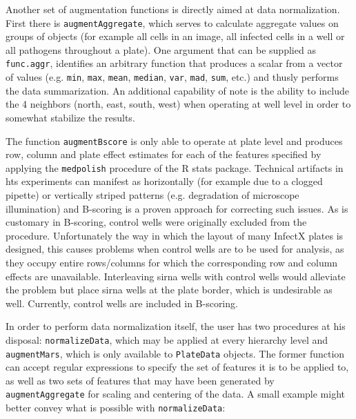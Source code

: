 Another set of augmentation functions is directly aimed at data normalization. First there is \texttt{augmentAggregate}, which serves to calculate aggregate values on groups of objects (for example all cells in an image, all infected cells in a well or all pathogens throughout a plate). One argument that can be supplied as \texttt{func.aggr}, identifies an arbitrary function that produces a scalar from a vector of values (e.g. \texttt{min}, \texttt{max}, \texttt{mean}, \texttt{median}, \texttt{var}, \texttt{mad}, \texttt{sum}, etc.) and thusly performs the data summarization. An additional capability of note is the ability to include the 4 neighbors (north, east, south, west) when operating at well level in order to somewhat stabilize the results.

The function \texttt{augmentBscore} is only able to operate at plate level and produces row, column and plate effect estimates for each of the features specified by applying the \texttt{medpolish} procedure of the R stats package. Technical artifacts in \gls{hts} experiments can manifest as horizontally (for example due to a clogged pipette) or vertically striped patterns (e.g. degradation of microscope illumination) and B-scoring is a proven approach for correcting such issues. As is customary in B-scoring, control wells were originally excluded from the procedure. Unfortunately the way in which the layout of many InfectX plates is designed, this causes problems when control wells are to be used for analysis, as they occupy entire rows\slash columns for which the corresponding row and column effects are unavailable. Interleaving \gls{sirna} wells with control wells would alleviate the problem but place \gls{sirna} wells at the plate border, which is undesirable as well. Currently, control wells are included in B-scoring.

In order to perform data normalization itself, the user has two procedures at his disposal: \texttt{normalizeData}, which may be applied at every hierarchy level and \texttt{augmentMars}, which is only available to \texttt{PlateData} objects. The former function can accept regular expressions to specify the set of features it is to be applied to, as well as two sets of features that may have been generated by \texttt{augmentAggregate} for scaling and centering of the data. A small example might better convey what is possible with \texttt{normalizeData}:

